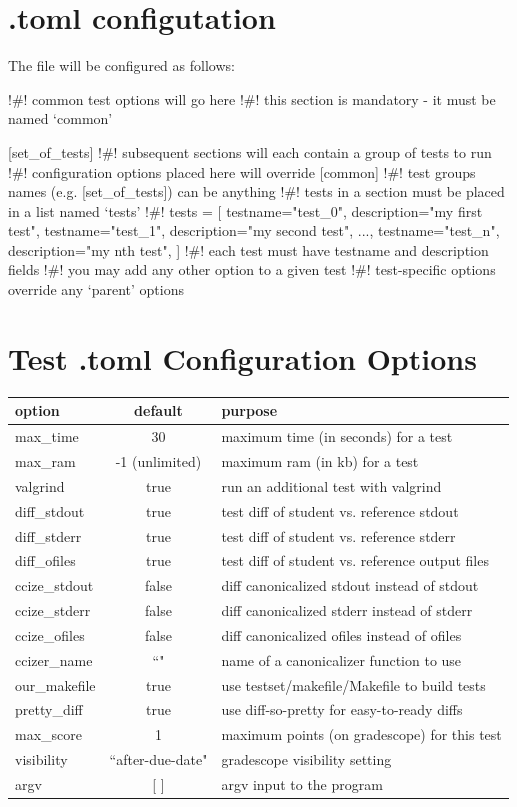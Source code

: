 \documentclass[11pt]{report}
\begin{document}
\section*{.toml configutation}
The  file will be configured as follows:
\begin{bashcodeblock}
[common]
!\#! common test options will go here
!\#! this section is mandatory - it must be named `common' 

[set_of_tests] 
!\#! subsequent sections will each contain a group of tests to run
!\#! configuration options placed here will override [common]
!\#! test groups names (e.g. [set_of_tests]) can be anything
!\#! tests in a section must be placed in a list named `tests'
!\#! tests = [
      {testname="test_0", description="my first test"},
      {testname="test_1", description="my second test"},
      ..., 
      {testname="test_n", description="my nth test"},
]
!\#! each test must have testname and description fields
!\#! you may add any other option to a given test
!\#! test-specific options override any `parent' options
\end{bashcodeblock}

\section*{Test .toml Configuration Options}
\begin{tabular}{ | l | c | l | }
\hline			
\textbf{option} & \textbf{default} & \textbf{purpose} \\ \hline\hline
max\_time & 30 & maximum time (in seconds) for a test \\\hline
max\_ram & -1 (unlimited) & maximum ram (in kb) for a test \\\hline
valgrind & true & run an additional test with valgrind \\\hline
diff\_stdout & true & test diff of student vs. reference stdout \\\hline
diff\_stderr & true & test diff of student vs. reference stderr \\\hline
diff\_ofiles & true & test diff of student vs. reference output files \\\hline
ccize\_stdout & false & diff canonicalized stdout instead of stdout \\\hline
ccize\_stderr & false & diff canonicalized stderr instead of stderr \\\hline
ccize\_ofiles & false & diff canonicalized ofiles instead of ofiles \\\hline
ccizer\_name & ``" & name of a canonicalizer function to use \\\hline
our\_makefile & true & use testset/makefile/Makefile to build tests \\\hline
pretty\_diff & true & use diff-so-pretty for easy-to-ready diffs \\\hline
max\_score & 1 & maximum points (on gradescope) for this test \\\hline
visibility &``after-due-date" & gradescope visibility setting \\\hline
argv & [ ] & argv input to the program \\\hline
\end{tabular}
\end{document}
